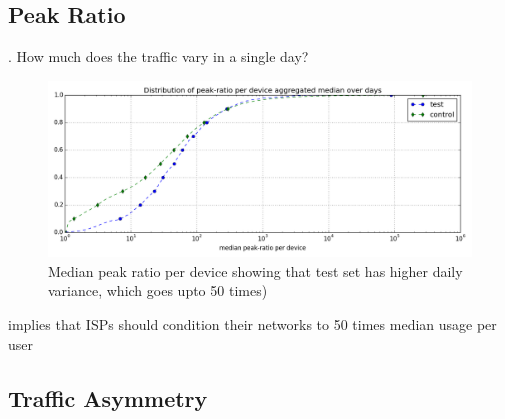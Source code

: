



\subsection{Peak Ratio}
\label{subsec:peak-ratio}

. How much does the traffic vary in a single day?


\begin{figure}[t!]
\begin{minipage}{1\linewidth}
\centering
\includegraphics[width=\linewidth]{figures/peakratio-CDF-devices-MEDIAN.png}
\caption{Median peak ratio per device showing that test set has higher daily variance, which goes upto 50 times)}
\label{fig:CDF-peak-ratio-median}
\end{minipage}
\end{figure}

implies that ISPs should condition their networks to 50 times median usage per user



%
%


\subsection{Traffic Asymmetry}
\label{subsec:asymmetry}
